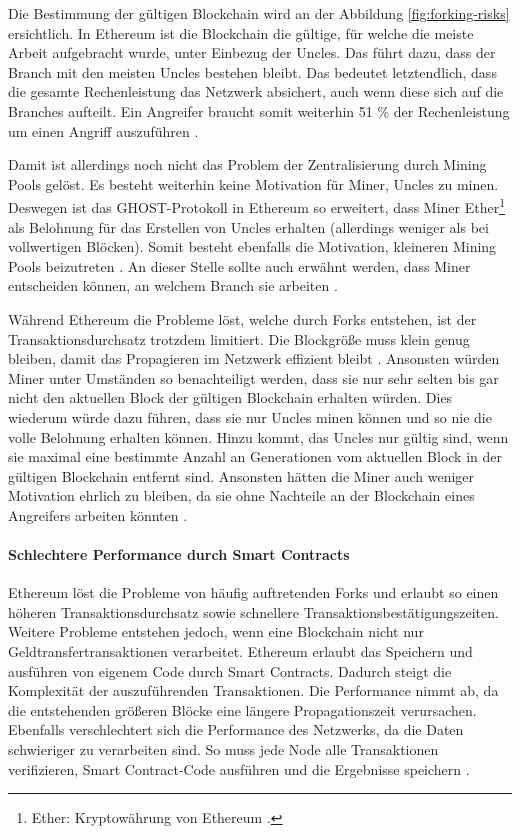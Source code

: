 Die Bestimmung der gültigen Blockchain wird an der Abbildung \ref{fig:forking-risks} ersichtlich. In Ethereum ist die Blockchain die gültige, für welche die meiste Arbeit aufgebracht wurde, unter Einbezug der Uncles. Das führt dazu, dass der Branch mit den meisten Uncles bestehen bleibt. Das bedeutet letztendlich, dass die gesamte Rechenleistung das Netzwerk absichert, auch wenn diese sich auf die Branches aufteilt. Ein Angreifer braucht somit weiterhin 51 \% der Rechenleistung um einen Angriff auszuführen \cite{SompolinskyAcceleratingBitcoinTransaction2013}.

Damit ist allerdings noch nicht das Problem der Zentralisierung durch Mining Pools gelöst. Es besteht weiterhin keine Motivation für Miner, Uncles zu minen. Deswegen ist das GHOST-Protokoll in Ethereum so erweitert, dass Miner Ether\footnote{Ether: Kryptowährung von Ethereum \cite{EthereumTeamEthereumWhitePaper2017}.} als Belohnung für das Erstellen von Uncles erhalten (allerdings weniger als bei vollwertigen Blöcken). Somit besteht ebenfalls die Motivation, kleineren Mining Pools beizutreten \cite{EthereumTeamEthereumWhitePaper2017}. An dieser Stelle sollte auch erwähnt werden, dass Miner entscheiden können, an welchem Branch sie arbeiten \cite{ZhengBlockchainChallengesOpportunities2017}.

Während Ethereum die Probleme löst, welche durch Forks entstehen, ist der Transaktionsdurchsatz trotzdem limitiert. Die Blockgröße muss klein genug bleiben, damit das Propagieren im Netzwerk effizient bleibt \cite{SchererPerformanceScalabilityBlockchain2017}. Ansonsten würden Miner unter Umständen so benachteiligt werden, dass sie nur sehr selten bis gar nicht den aktuellen Block der gültigen Blockchain erhalten würden. Dies wiederum würde dazu führen, dass sie nur Uncles minen können und so nie die volle Belohnung erhalten können. Hinzu kommt, das Uncles nur gültig sind, wenn sie maximal eine bestimmte Anzahl an Generationen vom aktuellen Block in der gültigen Blockchain entfernt sind. Ansonsten hätten die Miner auch weniger Motivation ehrlich zu bleiben, da sie ohne Nachteile an der Blockchain eines Angreifers arbeiten könnten \cite{EthereumTeamEthereumWhitePaper2017}.

\paragraph{Schlechtere Performance durch Smart Contracts}
Ethereum löst die Probleme von häufig auftretenden Forks und erlaubt so einen höheren Transaktionsdurchsatz sowie schnellere Transaktionsbestätigungszeiten. Weitere Probleme entstehen jedoch, wenn eine Blockchain nicht nur Geldtransfertransaktionen verarbeitet. Ethereum erlaubt das Speichern und ausführen von eigenem Code durch Smart Contracts. Dadurch steigt die Komplexität der auszuführenden Transaktionen. Die Performance nimmt ab, da die entstehenden größeren Blöcke eine längere Propagationszeit verursachen. Ebenfalls verschlechtert sich die Performance des Netzwerks, da die Daten schwieriger zu verarbeiten sind. So muss jede Node alle Transaktionen verifizieren, Smart Contract-Code ausführen und die Ergebnisse speichern \cite{SchererPerformanceScalabilityBlockchain2017}. 

